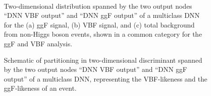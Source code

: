\begin{figure}[ht]
    \centering
     \\
    \caption{Two-dimensional distribution spanned by the two output nodes ``DNN VBF output'' and ``DNN ggF output'' of a multiclass DNN for the (a) ggF signal, (b) VBF signal, and (c) total background from non-Higgs boson events, shown in a common \TwoJet category for the ggF \TwoJet and VBF analysis.}
    \label{app:fig:2d-discriminant}
\end{figure}

\begin{figure}[t]
    \caption{Schematic of partitioning in two-dimensional discriminant spanned by the two output nodes ``DNN VBF output'' and ``DNN ggF output'' of a multiclass DNN, representing the VBF-likeness and the ggF-likeness of an event.}
    \label{app:hwwejet-schematic-partitioning}
\end{figure}

